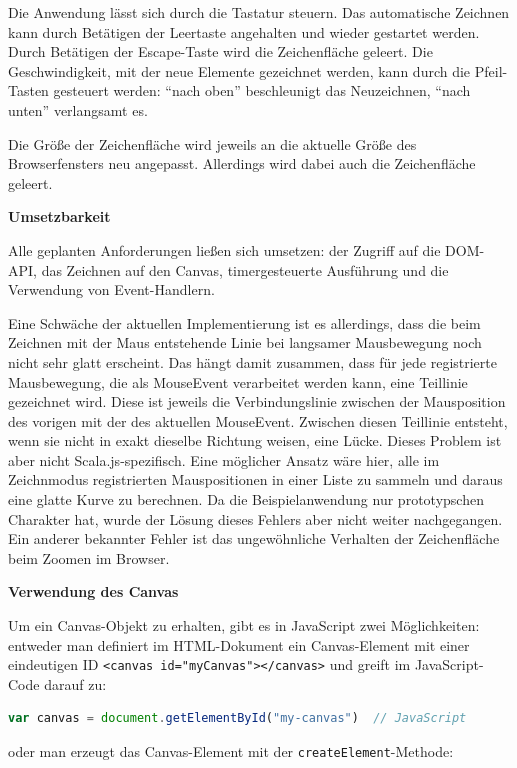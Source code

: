 \documentclass[a4paper, 12pt, hidelinks, listof=totoc, listoftables=totoc, bibliography=totoc]{scrreprt}
\newcommand{\js}[1]{\lstinline[language=JavaScript, style=inline]|#1|}
\newcommand{\html}[1]{\lstinline[language=HTML5, style=inline]|#1|}
\newcommand{\MyMiniSec}[1]{\rmfamily\fontsize{12}{15}\selectfont
	\vspace{7pt}\textbf{#1} %
}
\begin{document}
Die Anwendung lässt sich durch die Tastatur steuern. Das automatische Zeichnen kann durch Betätigen der Leertaste angehalten und wieder gestartet werden. Durch Betätigen der Escape-Taste wird die Zeichenfläche geleert. Die Geschwindigkeit, mit der neue Elemente gezeichnet werden, kann durch die Pfeil-Tasten gesteuert werden: "`nach oben"' beschleunigt das Neuzeichnen, "`nach unten"' verlangsamt es.

Die Größe der Zeichenfläche wird jeweils an die aktuelle Größe des Browserfensters neu angepasst. Allerdings wird dabei auch die Zeichenfläche geleert.


\MyMiniSec{Umsetzbarkeit}

Alle geplanten Anforderungen ließen sich umsetzen: der Zugriff auf die \ac{DOM}-\ac{API}, das Zeichnen auf den Canvas, timergesteuerte Ausführung und die Verwendung von Event-Handlern.

Eine Schwäche der aktuellen Implementierung ist es allerdings, dass die beim Zeichnen mit der Maus entstehende Linie bei langsamer Mausbewegung noch nicht sehr glatt erscheint. Das hängt damit zusammen, dass für jede registrierte Mausbewegung, die als MouseEvent verarbeitet werden kann, eine Teillinie gezeichnet wird. Diese ist jeweils die Verbindungslinie zwischen der Mausposition des vorigen mit der des aktuellen MouseEvent. Zwischen diesen Teillinie entsteht, wenn sie nicht in exakt dieselbe Richtung weisen, eine Lücke. Dieses Problem ist aber nicht Scala.js-spezifisch. Eine möglicher Ansatz wäre hier, alle im Zeichnmodus registrierten Mauspositionen in einer Liste zu sammeln und daraus eine glatte Kurve zu berechnen. Da die Beispielanwendung nur prototypschen Charakter hat, wurde der Lösung dieses Fehlers aber nicht weiter nachgegangen. Ein anderer bekannter Fehler ist das ungewöhnliche Verhalten der Zeichenfläche beim Zoomen im Browser.


\MyMiniSec{Verwendung des Canvas}

Um ein Canvas-Objekt zu erhalten, gibt es in JavaScript zwei Möglichkeiten: entweder man definiert im \ac{HTML}-Dokument ein Canvas-Element mit einer eindeutigen ID \html{<canvas id="myCanvas"></canvas>} und greift im JavaScript-Code darauf zu:

\begin{lstlisting}[language=JavaScript, style=snippet]
var canvas = document.getElementById("my-canvas")  // JavaScript
\end{lstlisting}

oder man erzeugt das Canvas-Element mit der \js{createElement}-Methode:
\end{document}
